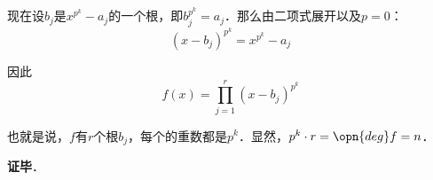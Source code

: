 现在设$b_j$是$x^{p^k}-a_j$的一个根，即$b_j^{p^k}=a_j$．那么由二项式展开以及$p=0$：
\begin{equation}
(x-b_j)^{p^k} = x^{p^k}-a_j
\end{equation}

因此
\begin{equation}
f(x) = \prod_{j=1}^{r} (x-b_j)^{p^k}
\end{equation}

也就是说，$f$有$r$个根$b_j$，每个的重数都是$p^k$．显然，$p^k\cdot r = \opn{deg}f = n$．

\textbf{证毕}．
















